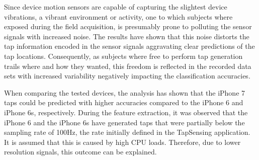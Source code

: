 
Since device motion sensors are capable of capturing the slightest device vibrations, a vibrant environment or activity, one to which subjects where exposed during the field acquisition, is presumably prone to polluting the sensor signals with increased noise. The results have shown that this noise distorts the tap information encoded in the sensor signals aggravating clear predictions of the tap locations. Consequently, as subjects where free to perform tap generation trails where and how they wanted, this freedom is reflected in the recorded data sets with increased variability negatively impacting the classification accuracies.

When comparing the tested devices, the analysis has shown that the iPhone 7 taps could be predicted with higher accuracies compared to the iPhone 6 and iPhone 6s, respectively. During the feature extraction, it was observed that the iPhone 6 and the iPhone 6s have generated taps that were partially below the sampling rate of 100Hz, the rate initially defined in the TapSensing application. It is assumed that this is caused by high CPU loads. Therefore, due to lower resolution signals, this outcome can be explained.

